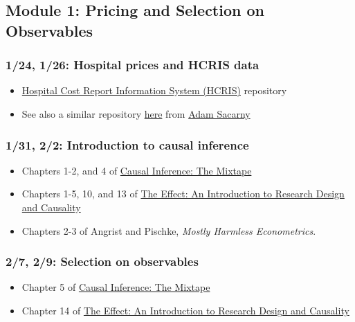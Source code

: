 \documentclass[11pt,]{article}
\providecommand{\tightlist}{%
  \setlength{\itemsep}{0pt}\setlength{\parskip}{0pt}}
\begin{document}
\hypertarget{module-1-pricing-and-selection-on-observables}{%
\subsection{Module 1: Pricing and Selection on
Observables}\label{module-1-pricing-and-selection-on-observables}}

\hypertarget{hospital-prices-and-hcris-data}{%
\subsubsection{1/24, 1/26: Hospital prices and HCRIS
data}\label{hospital-prices-and-hcris-data}}

\begin{itemize}
\tightlist
\item
  \href{https://github.com/imccart/HCRIS}{Hospital Cost Report
  Information System (HCRIS)} repository
\item
  See also a similar repository
  \href{https://github.com/asacarny/hospital-cost-reports}{here} from
  \href{http://sacarny.com/}{Adam Sacarny}
\end{itemize}

\hypertarget{introduction-to-causal-inference}{%
\subsubsection{1/31, 2/2: Introduction to causal
inference}\label{introduction-to-causal-inference}}

\begin{itemize}
\tightlist
\item
  Chapters 1-2, and 4 of \href{https://mixtape.scunning.com/}{Causal
  Inference: The Mixtape}
\item
  Chapters 1-5, 10, and 13 of \href{https://theeffectbook.net/}{The
  Effect: An Introduction to Research Design and Causality}
\item
  Chapters 2-3 of Angrist and Pischke, \emph{Mostly {Harmless}
  {Econometrics}}.
\end{itemize}

\hypertarget{selection-on-observables}{%
\subsubsection{2/7, 2/9: Selection on
observables}\label{selection-on-observables}}

\begin{itemize}
\tightlist
\item
  Chapter 5 of \href{https://mixtape.scunning.com/}{Causal Inference:
  The Mixtape}
\item
  Chapter 14 of \href{https://theeffectbook.net/}{The Effect: An
  Introduction to Research Design and Causality}
\end{itemize}
\end{document}
